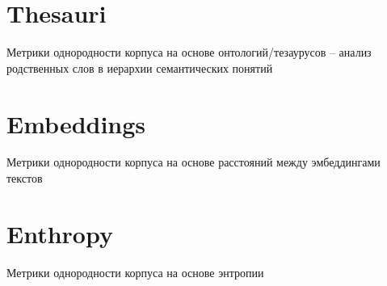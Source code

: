 \section{Thesauri}

Метрики однородности корпуса на основе онтологий/тезаурусов – анализ родственных слов в иерархии
семантических понятий

\section{Embeddings}

Метрики однородности корпуса на основе расстояний между эмбеддингами текстов

\section{Enthropy}

Метрики однородности корпуса на основе энтропии
